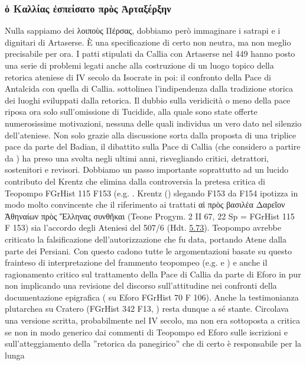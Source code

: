 {            \subsubsection{\textgreek{ὁ Καλλίας ἐσπείσατο πρὸς Ἀρταξέρξην}}
            \label{pacedicallia}Nulla sappiamo dei  \textgreek{λοιποὺς Πέρσας}, dobbiamo però immaginare i satrapi e i dignitari di Artaserse. È una specificazione di certo non neutra, ma non meglio precisabile per ora. I patti stipulati da Callia con Artaserse  nel 449 hanno posto una serie di problemi legati anche alla costruzione di un luogo topico della retorica ateniese di IV secolo da Isocrate in poi: il confronto della Pace di Antalcida con quella di Callia. \cite[4-5]{Bosworth1990} sottolinea l'indipendenza dalla tradizione storica dei luoghi sviluppati dalla retorica. Il dubbio sulla veridicità o meno della pace riposa ora solo sull'omissione di Tucidide, alla quale sono state offerte numerosissime motivazioni, nessuna delle quali individua un vero dato nel silenzio dell'ateniese. Non solo grazie alla discussione sorta dalla proposta di una triplice pace da parte del Badian, il dibattito sulla Pace di Callia (che considero a partire da \cite{Eddy1970}) ha preso una svolta negli ultimi anni, risvegliando critici, detrattori, sostenitori e revisori. Dobbiamo un passo importante soprattutto ad un lucido contributo del Krentz che elimina dalla controversia la pretesa critica di Teopompo  FGrHist 115 F153 (e.g. \cite[48 e 80]{Ferretto1984}. Krentz (\cite*[231s]{Krentz2009}) slegando F153 da F154 ipotizza in modo molto convincente che il riferimento ai trattati \textgreek{αἱ πρὸς βασιλέα Δαρεῖον Ἀθηναίων πρὸς Ἕλληνας συνθῆκαι} (Teone Progym. 2 II 67, 22 Sp = FGrHist 115 F 153) sia l'accordo degli Ateniesi del 507/6 (Hdt. \href{http://data.perseus.org/citations/urn:cts:greekLit:tlg0016.tlg001.perseus-grc1:5.73}{5.73}). Teopompo  avrebbe criticato la falsificazione dell'autorizzazione che fu data, portando Atene dalla parte dei Persiani. Con questo cadono tutte le argomentazioni basate su questo frainteso di interpretazione del frammento teopompeo (e.g. \cite[395]{Mazzarino1966} e \cite[80]{Shrimpton1991}) e anche il ragionamento critico sul trattamento della Pace di Callia da parte di Eforo in \cite[404-10]{Parmeggiani2011} pur non implicando una revisione del discorso sull'attitudine nei confronti della documentazione epigrafica (\cite[170-2]{Parmeggiani2011} su Eforo FGrHist 70 F 106). \label{Cratero}Anche la testimonianza plutarchea su Cratero (FGrHist 342 F13, \cite[29]{Erdas2002}) resta dunque a sé stante. Circolava una versione scritta, probabilmente nel IV secolo, ma non era sottoposta a critica se non in modo generico dai commenti di Teopompo  ed Eforo sulle iscrizioni e sull'atteggiamento della ''retorica da panegirico'' che di certo è responsabile per la lunga }

